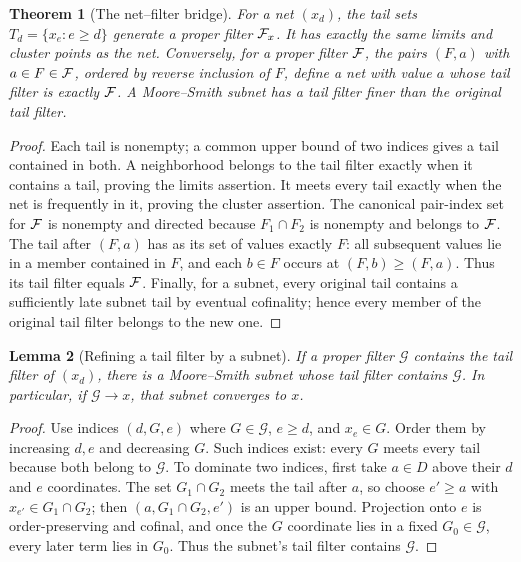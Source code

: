 \documentclass[11pt,oneside,openany]{book}
\newtheorem{theorem}{Theorem}[chapter]
\newtheorem{lemma}[theorem]{Lemma}
\theoremstyle{definition}
\theoremstyle{remark}
\begin{document}
\begin{theorem}[The net--filter bridge]\label{d10:04:filter-net}
For a net $(x_d)$, the tail sets $T_d=\{x_e:e\ge d\}$ generate a proper filter $\mathcal F_x$. It has exactly the same limits and cluster points as the net. Conversely, for a proper filter $\mathcal F$, the pairs $(F,a)$ with $a\in F\in\mathcal F$, ordered by reverse inclusion of $F$, define a net with value $a$ whose tail filter is exactly $\mathcal F$. A Moore--Smith subnet has a tail filter finer than the original tail filter.
\end{theorem}
\begin{proof}
Each tail is nonempty; a common upper bound of two indices gives a tail contained in both. A neighborhood belongs to the tail filter exactly when it contains a tail, proving the limits assertion. It meets every tail exactly when the net is frequently in it, proving the cluster assertion. The canonical pair-index set for $\mathcal F$ is nonempty and directed because $F_1\cap F_2$ is nonempty and belongs to $\mathcal F$. The tail after $(F,a)$ has as its set of values exactly $F$: all subsequent values lie in a member contained in $F$, and each $b\in F$ occurs at $(F,b)\ge(F,a)$. Thus its tail filter equals $\mathcal F$. Finally, for a subnet, every original tail contains a sufficiently late subnet tail by eventual cofinality; hence every member of the original tail filter belongs to the new one.
\end{proof}

\begin{lemma}[Refining a tail filter by a subnet]\label{d10:04:finer-subnet}
If a proper filter $\mathcal G$ contains the tail filter of $(x_d)$, there is a Moore--Smith subnet whose tail filter contains $\mathcal G$. In particular, if $\mathcal G\to x$, that subnet converges to $x$.
\end{lemma}
\begin{proof}
Use indices $(d,G,e)$ where $G\in\mathcal G$, $e\ge d$, and $x_e\in G$. Order them by increasing $d,e$ and decreasing $G$. Such indices exist: every $G$ meets every tail because both belong to $\mathcal G$. To dominate two indices, first take $a\in D$ above their $d$ and $e$ coordinates. The set $G_1\cap G_2$ meets the tail after $a$, so choose $e'\ge a$ with $x_{e'}\in G_1\cap G_2$; then $(a,G_1\cap G_2,e')$ is an upper bound. Projection onto $e$ is order-preserving and cofinal, and once the $G$ coordinate lies in a fixed $G_0\in\mathcal G$, every later term lies in $G_0$. Thus the subnet's tail filter contains $\mathcal G$.
\end{proof}
\end{document}
